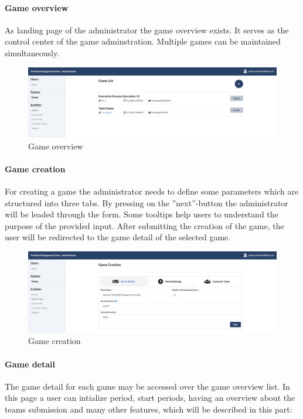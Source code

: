 \paragraph{Game overview}
As landing page of the administrator the game overview exists. It serves as the control center of the game adminstration. Multiple games can be maintained simultaneously.
\begin{figure}[h!]
  \centering
  \includegraphics[scale=0.2]{img/application-overview/administrator/02_game_overview.png}
  \caption{Game overview}
\end{figure}

\paragraph{Game creation}
For creating a game the administrator needs to define some parameters which are structured into three tabs. By pressing on the ''next''-button the administrator will be leaded through the form. Some tooltips help users to understand the purpose of the provided input. After submitting the creation of the game, the user will be redirected to the game detail of the selected game.
\begin{figure}[h!]
  \centering
  \includegraphics[scale=0.2]{img/application-overview/administrator/03_game_creation.png}
  \caption{Game creation}
\end{figure}


\paragraph{Game detail}
The game detail for each game may be accessed over the game overview list. In this page a user can intialize period, start periods, having an overview about the teams submission and many other features, which will be described in this part:

